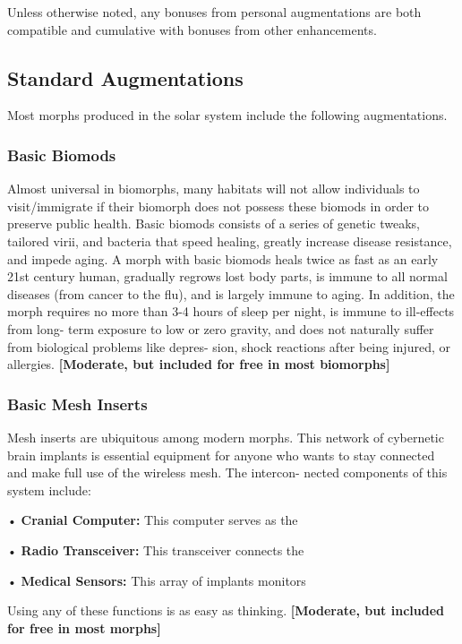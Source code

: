 Unless otherwise noted, any bonuses from personal 
augmentations are both compatible and cumulative 
with bonuses from other enhancements.

\subsection{Standard Augmentations}

Most morphs produced in the solar system include the 
following augmentations.

\subsubsection{Basic Biomods}

Almost universal in biomorphs, many habitats will not 
allow individuals to visit/immigrate if their biomorph 
does not possess these biomods in order to preserve 
public health. Basic biomods consists of a series of 
genetic tweaks, tailored virii, and bacteria that speed 
healing, greatly increase disease resistance, and impede 
aging. A morph with basic biomods heals twice as fast 
as an early 21st century human, gradually regrows lost 
body parts, is immune to all normal diseases (from 
cancer to the flu), and is largely immune to aging. In 
addition, the morph requires no more than 3-4 hours 
of sleep per night, is immune to ill-effects from long-
term exposure to low or zero gravity, and does not 
naturally suffer from biological problems like depres-
sion, shock reactions after being injured, or allergies. 
\textbf{[Moderate, but included for free in most biomorphs]}

\subsubsection{Basic Mesh Inserts}

Mesh inserts are ubiquitous among modern morphs. 
This network of cybernetic brain implants is essential 
equipment for anyone who wants to stay connected 
and make full use of the wireless mesh. The intercon-
nected components of this system include:

•  \textbf{Cranial Computer:} This computer serves as the 

•  \textbf{Radio Transceiver:} This transceiver connects the 

•  \textbf{Medical Sensors:} This array of implants monitors 

Using any of these functions is as easy as thinking. 
\textbf{[Moderate, but included for free in most morphs]}

